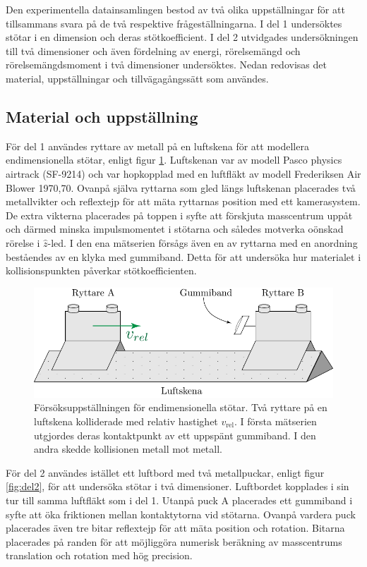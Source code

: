 Den experimentella datainsamlingen bestod av två olika uppställningar för att tillsammans svara på de två respektive frågeställningarna. I del 1 undersöktes stötar i en dimension och deras stötkoefficient. I del 2 utvidgades undersökningen till två dimensioner och även fördelning av energi, rörelsemängd och rörelsemängdsmoment i två dimensioner undersöktes. Nedan redovisas det material, uppställningar och tillvägagångssätt som användes.

\subsection{Material och uppställning} 

För del 1 användes ryttare av metall på en luftskena för att modellera endimensionella stötar, enligt figur \ref{fig:del1}. Luftskenan var av modell Pasco physics airtrack (SF-9214) och var hopkopplad med en luftfläkt av modell Frederiksen Air Blower 1970,70. Ovanpå själva ryttarna som gled längs luftskenan placerades två metallvikter och reflextejp för att mäta ryttarnas position med ett kamerasystem. De extra vikterna placerades på toppen i syfte att förskjuta masscentrum uppåt och därmed minska impulsmomentet i stötarna och således motverka oönskad rörelse i $\hat z$-led. I den ena mätserien försågs även en av ryttarna med en anordning beståendes av en klyka med gummiband. Detta för att undersöka hur materialet i kollisionspunkten påverkar stötkoefficienten.

\begin{figure}[H]
    \centering
    \includegraphics[width=0.8\linewidth]{images/metod/ryttare.pdf}
    \caption{Försöksuppställningen för endimensionella stötar. Två ryttare på en luftskena kolliderade med relativ hastighet $v_{\text{rel}}$. I första mätserien utgjordes deras kontaktpunkt av ett uppspänt gummiband. I den andra skedde kollisionen metall mot metall.}
    \label{fig:del1}
\end{figure}

 För del 2 användes istället ett luftbord med två metallpuckar, enligt figur \ref{fig:del2}, för att undersöka stötar i två dimensioner. Luftbordet kopplades i sin tur till samma luftfläkt som i del 1. Utanpå puck A placerades ett gummiband i syfte att öka friktionen mellan kontaktytorna vid stötarna. Ovanpå vardera puck placerades även tre bitar reflextejp för att mäta position och rotation. Bitarna placerades på randen för att möjliggöra numerisk beräkning av masscentrums translation och rotation med hög precision.
 
